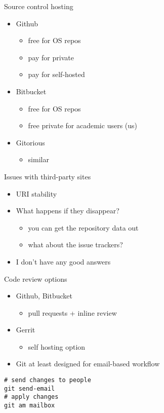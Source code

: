 \documentclass[presentation]{beamer}
\begin{document}
\begin{frame}[label=sec-4-1]{Source control hosting}
\begin{itemize}
\item Github
\begin{itemize}
\item free for OS repos
\item pay for private
\item pay for self-hosted
\end{itemize}
\item Bitbucket
\begin{itemize}
\item free for OS repos
\item free private for academic users (us)
\end{itemize}
\item Gitorious
\begin{itemize}
\item similar
\end{itemize}
\end{itemize}
\end{frame}
\begin{frame}[label=sec-4-2]{Issues with third-party sites}
\begin{itemize}
\item URI stability
\item What happens if they disappear?
\begin{itemize}
\item you can get the repository data out
\item what about the issue trackers?
\end{itemize}
\item I don't have any good answers
\end{itemize}
\end{frame}
\begin{frame}[fragile,label=sec-4-3]{Code review options}
 \begin{itemize}
\item Github, Bitbucket
\begin{itemize}
\item pull requests + inline review
\end{itemize}
\item Gerrit
\begin{itemize}
\item self hosting option
\end{itemize}
\item Git at least designed for email-based workflow
\end{itemize}
\begin{verbatim}
# send changes to people
git send-email
# apply changes
git am mailbox
\end{verbatim}
\end{frame}
\end{document}
